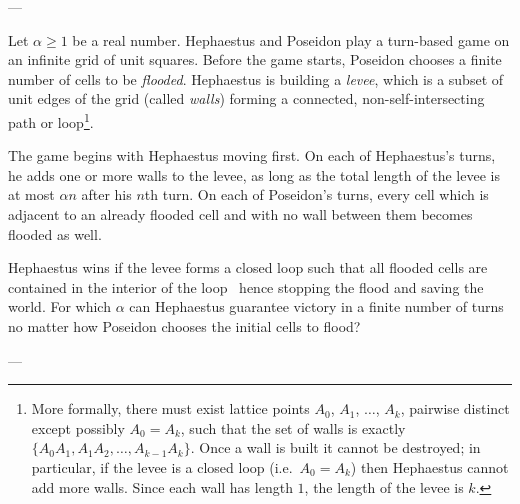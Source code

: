 
---

Let $\alpha\ge1$ be a real number. Hephaestus and Poseidon play a turn-based game on an infinite grid of unit squares. Before the game starts, Poseidon chooses a finite number of cells to be \emph{flooded}. Hephaestus is building a \emph{levee}, which is a subset of unit edges of the grid (called \emph{walls}) forming a connected, non-self-intersecting path or loop\footnote{More formally, there must exist lattice points $A_0$, $A_1$, $\ldots$, $A_k$, pairwise distinct except possibly $A_0=A_k$, such that the set of walls is exactly $\{A_0A_1,A_1A_2,\ldots,A_{k-1}A_k\}$. Once a wall is built it cannot be destroyed; in particular, if the levee is a closed loop (i.e.\ $A_0=A_k$) then Hephaestus cannot add more walls. Since each wall has length $1$, the length of the levee is $k$.}.

The game begins with Hephaestus moving first. On each of Hephaestus's turns, he adds one or more walls to the levee, as long as the total length of the levee is at most $\alpha n$ after his $n$th turn. On each of Poseidon's turns, every cell which is adjacent to an already flooded cell and with no wall between them becomes flooded as well.

Hephaestus wins if the levee forms a closed loop such that all flooded cells are contained in the interior of the loop \textemdash\ hence stopping the flood and saving the world. For which $\alpha$ can Hephaestus guarantee victory in a finite number of turns no matter how Poseidon chooses the initial cells to flood?

---

